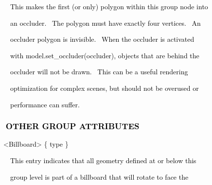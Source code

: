 \documentclass[a4paper]{article}
\newcommand\textstyleOOoComputerKeyWord[1]{\textrm{\textcolor[rgb]{0.0,0.0,0.5019608}{#1}}}
\newcommand\textstyleOOoAssemblerSpecialChar[1]{\textrm{\textcolor[rgb]{0.0,0.5019608,0.0}{#1}}}
\newcommand\textstyleOOoAssemblerIdent[1]{\textrm{\textcolor{black}{#1}}}
\begin{document}
\bigskip

{\color{black}
\textstyleOOoComputerKeyWord{\textcolor{black}{\ \ \ \ This makes the first (or only) polygon within this group node
into}}}

\clearpage
\bigskip

{\color{black}
\textstyleOOoComputerKeyWord{\textcolor{black}{\ \ \ \ an occluder. \ The polygon must have exactly four vertices.
\ An}}}

{\color{black}
\textstyleOOoComputerKeyWord{\textcolor{black}{\ \ \ \ occluder polygon is invisible. \ When the occluder is
activated}}}

{\color{black}
\textstyleOOoComputerKeyWord{\textcolor{black}{\ \ \ \ with model.set\_occluder(occluder), objects that are behind
the}}}

{\color{black}
\textstyleOOoComputerKeyWord{\textcolor{black}{\ \ \ \ occluder will not be drawn. \ This can be a useful rendering}}}

{\color{black}
\textstyleOOoComputerKeyWord{\textcolor{black}{\ \ \ \ optimization for complex scenes, but should not be overused or}}}

{\color{black}
\textstyleOOoComputerKeyWord{\textcolor{black}{\ \ \ \ performance can suffer.}}}


\bigskip

\subsubsection[\ \ OTHER GROUP ATTRIBUTES]{\textstyleOOoComputerKeyWord{\textcolor{black}{\ \ OTHER GROUP ATTRIBUTES}}}
\hypertarget{RefHeading7690869075401}{}
\bigskip

{\color{black}
\textstyleOOoComputerKeyWord{\textcolor{black}{\ \ }}\textstyleOOoAssemblerSpecialChar{{\textless}}\textstyleOOoAssemblerIdent{Billboard}\textstyleOOoAssemblerSpecialChar{{\textgreater}}\textstyleOOoComputerKeyWord{\textcolor{black}{
}}\textstyleOOoAssemblerSpecialChar{\{}\textstyleOOoComputerKeyWord{\textcolor{black}{
}}\textstyleOOoAssemblerIdent{type}\textstyleOOoComputerKeyWord{\textcolor{black}{
}}\textstyleOOoAssemblerSpecialChar{\}}}


\bigskip

{\color{black}
\textstyleOOoComputerKeyWord{\textcolor{black}{\ \ \ \ This entry indicates that all geometry defined at or below
this}}}

{\color{black}
\textstyleOOoComputerKeyWord{\textcolor{black}{\ \ \ \ group level is part of a billboard that will rotate to face
the}}}
\end{document}
